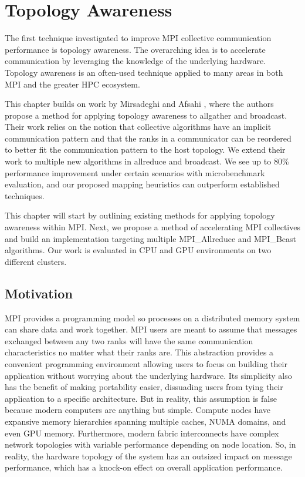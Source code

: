 
\glsresetall %
\chapter[Topology]{Topology Awareness}\label{ch:TopologyAwareness}

The first technique investigated to improve MPI collective communication performance is topology awareness.
The overarching idea is to accelerate communication by leveraging the knowledge of the underlying hardware.
Topology awareness is an often-used technique applied to many areas in both MPI and the greater HPC ecosystem.

This chapter builds on work by Mirsadeghi and Afsahi \cite{Mirsadeghi2016TopoAwareCollRR}, where the authors propose a method for applying topology awareness to allgather and broadcast.
Their work relies on the notion that collective algorithms have an implicit communication pattern and that the ranks in a communicator can be reordered to better fit the communication pattern to the host topology.
We extend their work to multiple new algorithms in allreduce and broadcast.
We see up to 80\% performance improvement under certain scenarios with microbenchmark evaluation, and our proposed mapping heuristics can outperform established techniques.

This chapter will start by outlining existing methods for applying topology awareness within MPI.
Next, we propose a method of accelerating MPI collectives and build an implementation targeting multiple MPI\_Allreduce and MPI\_Bcast algorithms.
Our work is evaluated in CPU and GPU environments on two different clusters.

\section{Motivation}
MPI provides a programming model so processes on a distributed memory system can share data and work together.
MPI users are meant to assume that messages exchanged between any two ranks will have the same communication characteristics no matter what their ranks are. 
This abstraction provides a convenient programming environment allowing users to focus on building their application without worrying about the underlying hardware. 
Its simplicity also has the benefit of making portability easier, dissuading users from tying their application to a specific architecture.
But in reality, this assumption is false because modern computers are anything but simple. 
Compute nodes have expansive memory hierarchies spanning multiple caches, NUMA domains, and even GPU memory.
Furthermore, modern fabric interconnects have complex network topologies with variable performance depending on node location.
So, in reality, the hardware topology of the system has an outsized impact on message performance, which has a knock-on effect on overall application performance. 

